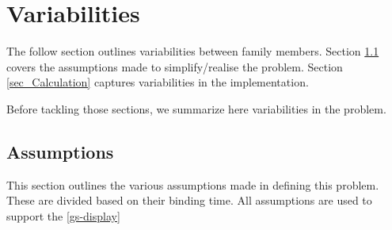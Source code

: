 \documentclass[12pt]{article}
\begin{document}
\section{Variabilities}
The follow section outlines variabilities between family members. Section 
\ref{sec_Assumptions} covers the assumptions made to simplify/realise the 
problem. Section \ref{sec_Calculation} captures variabilities in the 
implementation.

Before tackling those sections, we summarize here variabilities in the problem.

\subsection{Assumptions} \label{sec_Assumptions}
This section outlines the various assumptions made in defining this problem.  
These are divided based on their binding time. All assumptions are used to 
support the \ref{gs-display}
\end{document}
